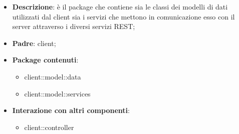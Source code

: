 \begin{itemize}
	\item \textbf{Descrizione}: è il package che contiene sia le classi dei modelli di dati utilizzati dal client sia i servizi che mettono in comunicazione esso con il server attraverso i diversi servizi REST;
	\item \textbf{Padre}: client;
	\item \textbf{Package contenuti}:
		\begin{itemize}
			\item client::model::data
			\item client::model::services
		\end{itemize}
	\item \textbf{Interazione con altri componenti}:
		\begin{itemize}
			\item client::controller
		\end{itemize}
\end{itemize}



